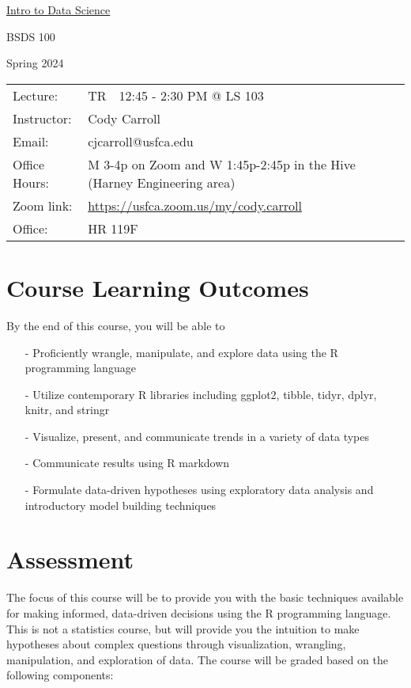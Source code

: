 \documentclass[10pt, oneside]{article}
\begin{document}
	\begin{center} \Large{\underline{Intro to Data Science}} \end{center} 
\begin{center} \Large{BSDS 100} \end{center} 
\begin{center} \Large{Spring 2024} \end{center} 
\begin{table}[ht]
\begin{tabular}{lllll}
 Lecture:&  TR~~12:45  - 2:30  PM @ LS 103	 &   \\ 
 Instructor: & Cody Carroll&  \\
 Email:  & cjcarroll@usfca.edu & \\ 
 Office Hours: & M 3-4p on  Zoom and W 1:45p-2:45p in the Hive (Harney Engineering area)\\ 
 Zoom link: &  \url{https://usfca.zoom.us/my/cody.carroll}\\
 Office: &  HR 119F\\ 
\end{tabular}
\end{table}

\thispagestyle{empty}
\section*{Course Learning Outcomes}
By the end of this course, you will be able to

\begin{itemize}
	\item[-] Proficiently wrangle, manipulate, and explore data using the R programming language
	\item[-] Utilize contemporary R libraries including ggplot2, tibble, tidyr, dplyr, knitr, and stringr
	\item[-] Visualize, present, and communicate trends in a variety of data types
	\item[-] Communicate results using R markdown 
	\item[-] Formulate data-driven hypotheses using exploratory data analysis and introductory model building techniques
\end{itemize}



\section*{Assessment}
The focus of this course will be to provide you with the basic techniques available for making informed, data-driven decisions using the R programming language. This is not a statistics course, but will provide you the intuition to make hypotheses about complex questions through visualization, wrangling, manipulation, and exploration of data. The course will be graded based on the following components:
\end{document}
